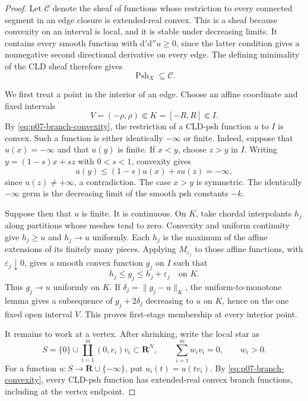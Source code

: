 \begin{proof}
Let $\mathscr C$ denote the sheaf of functions whose restriction to every
connected segment in an edge closure is extended-real convex.  This is a
sheaf because convexity on an interval is local, and it is stable under
decreasing limits.  It contains every smooth function with
$\mathrm d'\mathrm d''u\geq0$, since the latter condition gives a
nonnegative second directional derivative on every edge.  The defining
minimality of the CLD sheaf therefore gives
\begin{equation}
\label{eq:p07-branch-convexity}
                         \operatorname{Psh}_X\subseteq\mathscr C.
\end{equation}

We first treat a point in the interior of an edge.  Choose an affine
coordinate and fixed intervals
\[
                       V=(-\rho,\rho)
                       \Subset K=[-R,R]
                       \Subset I.
\]
By \eqref{eq:p07-branch-convexity}, the restriction of a CLD-psh function
$u$ to $I$ is convex.  Such a function is either identically $-\infty$ or
finite.  Indeed, suppose that $u(x)=-\infty$ and that $u(y)$ is finite.  If
$x<y$, choose $z>y$ in $I$.  Writing $y=(1-s)x+sz$ with $0<s<1$, convexity
gives
\[
                    u(y)\leq(1-s)u(x)+s u(z)=-\infty,
\]
since $u(z)\neq+\infty$, a contradiction.  The case $x>y$ is symmetric.
The identically $-\infty$ germ is the decreasing limit of the smooth psh
constants $-k$.

Suppose then that $u$ is finite.  It is continuous.  On $K$, take chordal
interpolants $h_j$ along partitions whose meshes tend to zero.  Convexity
and uniform continuity give $h_j\geq u$ and $h_j\to u$ uniformly.  Each
$h_j$ is the maximum of the affine extensions of its finitely many pieces.
Applying $M_{\varepsilon_j}$ to those affine functions, with
$\varepsilon_j\downarrow0$, gives a smooth convex function $g_j$ on $I$
such that
\[
                         h_j\leq g_j\leq h_j+\varepsilon_j
                         \quad\text{on }K.
\]
Thus $g_j\to u$ uniformly on $K$.  If
$\delta_j=\lVert g_j-u\rVert_K$, the uniform-to-monotone lemma gives a
subsequence of $g_j+2\delta_j$ decreasing to $u$ on $K$, hence on the one
fixed open interval $V$.  This proves first-stage membership at every
interior point.

It remains to work at a vertex.  After shrinking, write the local star as
\[
 S=\{0\}\cup\coprod_{i=1}^m(0,r_i)v_i\subset\mathbf R^N,
 \qquad
 \sum_{i=1}^m w_i v_i=0,
 \qquad w_i>0.
\]
For a function $u:S\to\mathbf R\cup\{-\infty\}$, put
$u_i(t)=u(tv_i)$.  By \eqref{eq:p07-branch-convexity}, every CLD-psh
function has extended-real convex branch functions, including at the
vertex endpoint.


\end{proof}
